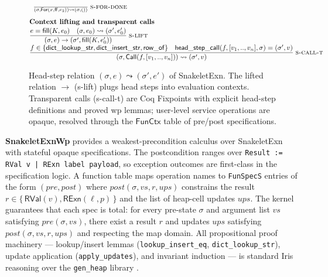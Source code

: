 \documentclass[11pt,a4paper]{article}
\begin{document}
\begin{figure}[t]
{\begin{minipage}{\linewidth}
\[\begin{array}{@{}l@{}}
\;\;
\frac{\mathstrut}{\mathstrut(\sigma,\mathsf{For}(x,\mathsf{ff},e_2))\leadsto(\sigma,())}\;\textsc{s-for-done}
\\[10pt]
\textbf{Context lifting and transparent calls} \\[2pt]
\displaystyle
\frac{\mathstrut e=\mathsf{fill}(K,e_0)\quad (\sigma,e_0)\leadsto(\sigma',e_0')}
     {\mathstrut(\sigma,e)\rightarrow(\sigma',\mathsf{fill}(K,e_0'))}\;\textsc{s-lift}
\\[7pt]
\displaystyle
\frac{\mathstrut f\in\{\mathsf{dict\_lookup\_str},\mathsf{dict\_insert\_str},\mathsf{row\_of}\}\quad
         \mathsf{head\_step\_call}(f,[v_1,..,v_n],\sigma)=(\sigma',v)}
     {\mathstrut(\sigma,\mathsf{Call}(f,[v_1,..,v_n]))\leadsto(\sigma',v)}\;\textsc{s-call-t}
\end{array}
\]
\vspace{4pt}
\end{minipage}}
\caption{Head-step relation $(\sigma, e) \leadsto (\sigma', e')$ of
  SnakeletExn.  The lifted relation $\to$ (s-lift) plugs head steps
  into evaluation contexts.  Transparent calls (s-call-t) are Coq
  Fixpoints with explicit head-step definitions and proved wp lemmas;
  user-level service operations are opaque, resolved through the
  $\mathsf{FunCtx}$ table of pre/post specifications.}
\label{fig:snakelet-semantics}
\end{figure}

\textbf{SnakeletExnWp} provides a weakest-precondition calculus over
SnakeletExn with stateful opaque specifications.  The postcondition
ranges over \texttt{Result := RVal v | RExn label payload}, so
exception outcomes are first-class in the specification logic.  A
function table maps operation names to \texttt{FunSpecS} entries of
the form $(\mathit{pre}, \mathit{post})$ where
$\mathit{post}(\sigma, vs, r, \mathit{ups})$ constrains the result $r
\in \{\,\mathsf{RVal}(v), \mathsf{RExn}(\ell, p)\,\}$
and the list of heap-cell updates $\mathit{ups}$.  The kernel
guarantees that each spec is total: for every pre-state $\sigma$ and
argument list $vs$ satisfying $\mathit{pre}(\sigma, vs)$, there exist
a result $r$ and updates $\mathit{ups}$ satisfying
$\mathit{post}(\sigma, vs, r, \mathit{ups})$ and respecting the map
domain.  All propositional proof machinery --- lookup/insert lemmas
(\texttt{lookup\_insert\_eq}, \texttt{dict\_lookup\_str}), update
application (\texttt{apply\_updates}), and invariant induction --- is
standard Iris reasoning over the \texttt{gen\_heap} library
\cite{Jung18,Iris}.
\end{document}
